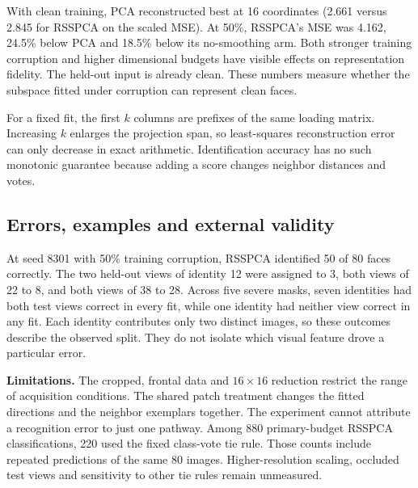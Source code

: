 With clean training, PCA reconstructed best at 16 coordinates (2.661 versus 2.845 for RSSPCA on the scaled MSE). At 50\%, RSSPCA's MSE was 4.162, 24.5\% below PCA and 18.5\% below its no-smoothing arm. Both stronger training corruption and higher dimensional budgets have visible effects on representation fidelity. The held-out input is already clean. These numbers measure whether the subspace fitted under corruption can represent clean faces.

For a fixed fit, the first $k$ columns are prefixes of the same loading matrix. Increasing $k$ enlarges the projection span, so least-squares reconstruction error can only decrease in exact arithmetic. Identification accuracy has no such monotonic guarantee because adding a score changes neighbor distances and votes.

\clearpage
\subsection{Errors, examples and external validity}


At seed 8301 with 50\% training corruption, RSSPCA identified 50 of 80 faces correctly. The two held-out views of identity 12 were assigned to 3, both views of 22 to 8, and both views of 38 to 28. Across five severe masks, seven identities had both test views correct in every fit, while one identity had neither view correct in any fit. Each identity contributes only two distinct images, so these outcomes describe the observed split. They do not isolate which visual feature drove a particular error.

\textbf{Limitations.} The cropped, frontal data and $16\times16$ reduction restrict the range of acquisition conditions. The shared patch treatment changes the fitted directions and the neighbor exemplars together. The experiment cannot attribute a recognition error to just one pathway. Among 880 primary-budget RSSPCA classifications, 220 used the fixed class-vote tie rule. Those counts include repeated predictions of the same 80 images. Higher-resolution scaling, occluded test views and sensitivity to other tie rules remain unmeasured.

